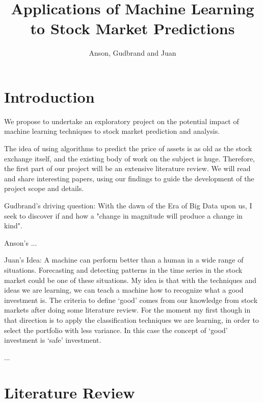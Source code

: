 \documentclass[12pt, oneside]{article}
\title{Applications of Machine Learning to Stock Market Predictions}
\author{Anson, Gudbrand and Juan}
\def\blu#1{{\color{blu}#1}}
\begin{document}
\maketitle

\section{Introduction}

We propose to undertake an exploratory project on the potential impact of machine learning techniques to stock market prediction and analysis. 

The idea of using algorithms to predict the price of assets is as old as the stock exchange itself, and the existing body of work on the subject is huge. Therefore, the first part of our project will be an extensive literature review. We will read and share interesting papers, using our findings to guide the development of the project scope and details.

\blu{Gudbrand's driving question:} With the dawn of the Era of Big Data upon us, I seek to discover if and how a "change in magnitude will produce a change in kind".

\blu{Anson's ...}

\blu{Juan's Idea:} A machine can perform better than a human in a wide range of situations. Forecasting and detecting patterns in the time series in the stock market could be one of these situations.
My idea is that with the techniques and ideas we are learning, we can teach a machine how to recognize what a good investment is. The criteria to define `good' comes from our knowledge 
from stock markets after doing some literature review. For the moment my first though in that direction is to apply the classification techniques we are learning,  in order to select the portfolio
with less variance. In this case the concept of `good' investment is `safe' investment.

...

\section{Literature Review}
\end{document}

